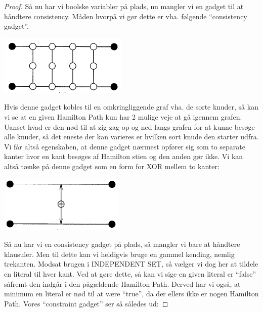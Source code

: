 \begin{proof}
Så nu har vi boolske variabler på plads, nu mangler vi en gadget til at
håndtere consistency. Måden hvorpå vi gør dette er vha. følgende ``consistency
gadget''.

\begin{center}
 \includegraphics[bb=0 0 173 81]{img/consistencyGadget.png}
\end{center}

Hvis denne gadget kobles til en omkringliggende graf vha. de sorte knuder, så
kan vi se at en given Hamilton Path kun har 2 mulige veje at gå igennem grafen.
Uanset hvad er den nød til at zig-zag op og ned langs grafen for at kunne
besøge alle knuder, så det eneste der kan varieres er hvilken sort knude den
starter udfra. Vi får altså egenskaben, at denne gadget nærmest opfører sig som
to separate kanter hvor en kant besøges af Hamilton stien og den anden gør
ikke. Vi kan altså tænke på denne gadget som en form for XOR mellem to kanter:

\begin{center}
 \includegraphics[bb=0 0 173 81]{img/consistencyGadget2.png}
\end{center}

Så nu har vi en consistency gadget på plads, så mangler vi bare at håndtere
klausuler. Men til dette kan vi heldigvis bruge en gammel kending, nemlig
trekanten. Modsat brugen i INDEPENDENT SET, så vælger vi dog her at tildele en
literal til hver kant. Ved at gøre dette, så kan vi sige en given literal er
``false'' såfremt den indgår i den pågældende Hamilton Path. Derved har vi
også, at minimum en literal er nød til at være ``true'', da der ellers ikke er
nogen Hamilton Path. Vores ``constraint gadget'' ser så således ud:


\end{proof}
